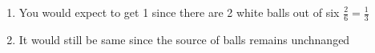 \documentclass{homework}
\begin{document}
\begin{sol}

  \begin{enumerate}[label=(\alph*)]
    \item You would expect to get 1 since there are 2 white balls out of six $\frac{2}{6} = \frac{1}{3}$
    \item It would still be same since the source of balls remains unchnanged
  \end{enumerate}

\end{sol}
\end{document}
